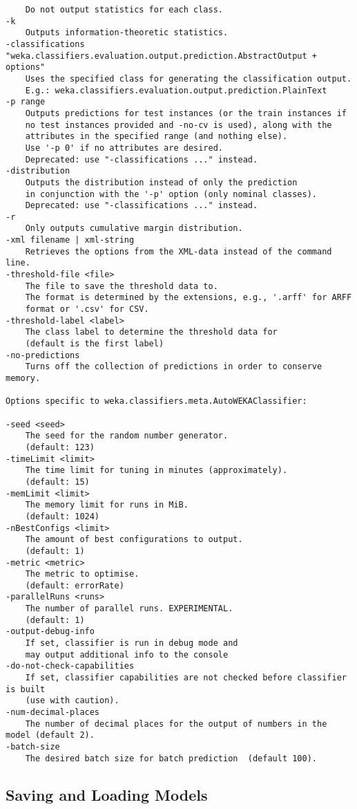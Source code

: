 \documentclass{article}
\begin{document}
\begin{verbatim}
	Do not output statistics for each class.
-k
	Outputs information-theoretic statistics.
-classifications "weka.classifiers.evaluation.output.prediction.AbstractOutput + options"
	Uses the specified class for generating the classification output.
	E.g.: weka.classifiers.evaluation.output.prediction.PlainText
-p range
	Outputs predictions for test instances (or the train instances if
	no test instances provided and -no-cv is used), along with the
	attributes in the specified range (and nothing else).
	Use '-p 0' if no attributes are desired.
	Deprecated: use "-classifications ..." instead.
-distribution
	Outputs the distribution instead of only the prediction
	in conjunction with the '-p' option (only nominal classes).
	Deprecated: use "-classifications ..." instead.
-r
	Only outputs cumulative margin distribution.
-xml filename | xml-string
	Retrieves the options from the XML-data instead of the command line.
-threshold-file <file>
	The file to save the threshold data to.
	The format is determined by the extensions, e.g., '.arff' for ARFF
	format or '.csv' for CSV.
-threshold-label <label>
	The class label to determine the threshold data for
	(default is the first label)
-no-predictions
	Turns off the collection of predictions in order to conserve memory.

Options specific to weka.classifiers.meta.AutoWEKAClassifier:

-seed <seed>
	The seed for the random number generator.
	(default: 123)
-timeLimit <limit>
	The time limit for tuning in minutes (approximately).
	(default: 15)
-memLimit <limit>
	The memory limit for runs in MiB.
	(default: 1024)
-nBestConfigs <limit>
	The amount of best configurations to output.
	(default: 1)
-metric <metric>
	The metric to optimise.
	(default: errorRate)
-parallelRuns <runs>
	The number of parallel runs. EXPERIMENTAL.
	(default: 1)
-output-debug-info
	If set, classifier is run in debug mode and
	may output additional info to the console
-do-not-check-capabilities
	If set, classifier capabilities are not checked before classifier is built
	(use with caution).
-num-decimal-places
	The number of decimal places for the output of numbers in the model (default 2).
-batch-size
	The desired batch size for batch prediction  (default 100).
\end{verbatim}

\subsection{Saving and Loading Models}
\end{document}
